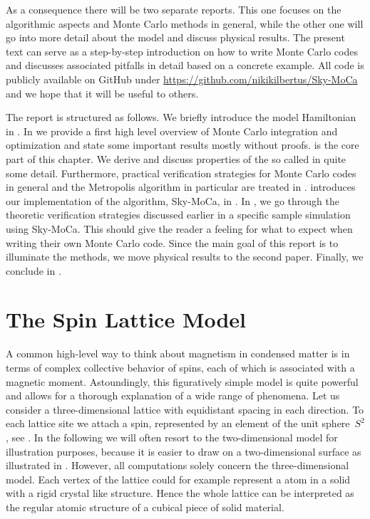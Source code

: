 As a consequence there will be two separate reports. This one focuses on the
algorithmic aspects and Monte Carlo methods in general, while the other one will
go into more detail about the model and discuss physical results. The present
text can serve as a step-by-step introduction on how to write Monte Carlo codes
and discusses associated pitfalls in detail based on a concrete example. All
code is publicly available on GitHub under
\href{https://github.com/nikikilbertus/Sky-MoCa}{\textsf{https://github.com/nikikilbertus/Sky-MoCa}}
and we hope that it will be useful to others.

The report is structured as follows. We briefly introduce the model Hamiltonian
in . In  we provide a first high level
overview of Monte Carlo integration and optimization and state some important
results mostly without proofs.  is the core part of this
chapter. We derive and discuss properties of the so called  in quite some detail. Furthermore, practical verification strategies
for Monte Carlo codes in general and the Metropolis algorithm in particular are
treated in .  introduces our implementation
of the algorithm, Sky-MoCa, in . In , we go
through the theoretic verification strategies discussed earlier in a specific
sample simulation using Sky-MoCa. This should give the reader a feeling for what
to expect when writing their own Monte Carlo code. Since the main goal of this
report is to illuminate the methods, we move physical results to the second
paper. Finally, we conclude in .
%
\section{The Spin Lattice Model}\label{sec:model}
%
A common high-level way to think about magnetism in condensed matter is in terms
of complex collective behavior of spins, each of which is associated with a
magnetic moment. Astoundingly, this figuratively simple model is quite powerful
and allows for a thorough explanation of a wide range of phenomena. Let us
consider a three-dimensional lattice with equidistant spacing in each direction.
To each lattice site we attach a spin, represented by an element of the unit
sphere~$S^2$, see . In the following we will often resort to the
two-dimensional model for illustration purposes, because it is easier to draw on
a two-dimensional surface as illustrated in . However, all
computations solely concern the three-dimensional model. Each vertex of the
lattice could for example represent a atom in a solid with a rigid crystal
like structure. Hence the whole lattice can be interpreted as the regular atomic
structure of a cubical piece of solid material.

